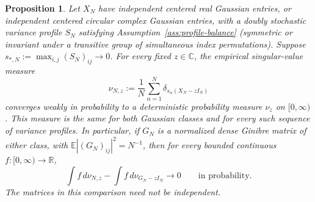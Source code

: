 \documentclass[10pt,a4paper]{amsart}
\newtheorem{proposition}{Proposition}
\begin{document}
\begin{proposition}\label{prop:global}
Let $X_N$ have independent centered real Gaussian entries, or independent
centered circular complex Gaussian entries, with a doubly stochastic
variance profile $S_N$ satisfying Assumption~\ref{ass:profile-balance}
(symmetric or invariant under a transitive group of simultaneous index
permutations).  Suppose
$s_{*,N}:=\max_{i,j}(S_N)_{ij}\to0$.  For every fixed $z\in\mathbb C$, the
empirical singular-value measure
\[
 \nu_{N,z}:=\frac1N\sum_{\alpha=1}^N
 \delta_{s_\alpha(X_N-zI_N)}
\]
converges weakly in probability to a deterministic probability measure
$\nu_z$ on $[0,\infty)$.  This measure is the same for both Gaussian
classes and for every such sequence of variance profiles.  In particular,
if $G_N$ is a normalized dense Ginibre matrix of either class, with
$\mathbb E|(G_N)_{ij}|^2=N^{-1}$, then for every bounded continuous
$f:[0,\infty)\to\mathbb R$,
\begin{equation}\label{eq:global-comparison}
 \int f\,d\nu_{N,z}-\int f\,d\nu_{G_N-zI_N}
 \longrightarrow0\qquad\text{in probability}.
\end{equation}
The matrices in this comparison need not be independent.
\end{proposition}
\end{document}
